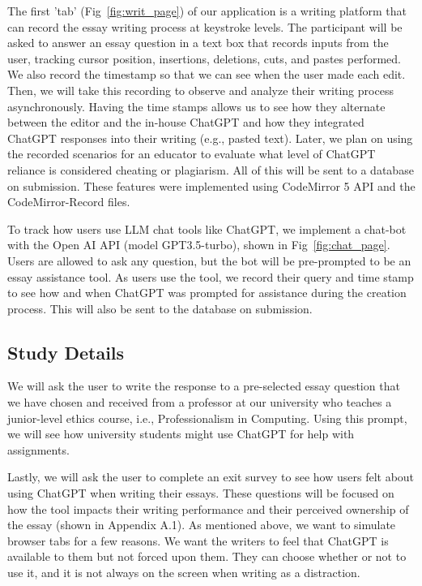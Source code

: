 \documentclass[sigconf]{acmart}
\begin{document}
    The first 'tab' (Fig~\ref{fig:writ_page}) of our application is a writing platform that can record the essay writing process at keystroke levels. The participant will be asked to answer an essay question in a text box that records inputs from the user, tracking cursor position, insertions, deletions, cuts, and pastes performed. We also record the timestamp so that we can see when the user made each edit. Then, we will take this recording to observe and analyze their writing process asynchronously. Having the time stamps allows us to see how they alternate between the editor and the in-house ChatGPT and how they integrated ChatGPT responses into their writing (e.g., pasted text).  Later, we plan on using the recorded scenarios for an educator to evaluate what level of ChatGPT reliance is considered cheating or plagiarism. 
    All of this will be sent to a database on submission. These features were implemented using CodeMirror 5 API and the CodeMirror-Record \cite{Jisuanke2023} files. 

    To track how users use LLM chat tools like ChatGPT, we implement a chat-bot with the Open AI API (model GPT3.5-turbo), shown in Fig~\ref{fig:chat_page}. Users are allowed to ask any question, but the bot will be pre-prompted to be an essay assistance tool. As users use the tool, we record their query and time stamp to see how and when ChatGPT was prompted for assistance during the creation process. This will also be sent to the database on submission.

\subsection{Study Details}
    We will ask the user to write the response to a pre-selected essay question that we have chosen and received from a professor at our university who teaches a junior-level ethics course, i.e.,  Professionalism in Computing. Using this prompt, we will see how university students might use ChatGPT for help with assignments.%
    
    Lastly, we will ask the user to complete an exit survey to see how users felt about using ChatGPT when writing their essays. These questions will be focused on how the tool impacts their writing performance and their perceived ownership of the essay (shown in Appendix A.1). As mentioned above, we want to simulate browser tabs for a few reasons. We want the writers to feel that ChatGPT is available to them but not forced upon them. They can choose whether or not to use it, and it is not always on the screen when writing as a distraction.
\end{document}
